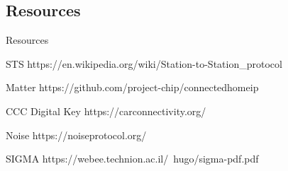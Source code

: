 \documentclass{ctexbeamer}
\begin{document}
\subsection{Resources}
\begin{frame}{Resources}

    \begin{thebibliography}{99}
         STS
            https://en.wikipedia.org/wiki/Station-to-Station\_protocol

         Matter
            https://github.com/project-chip/connectedhomeip

          CCC Digital Key
            https://carconnectivity.org/

         Noise
            https://noiseprotocol.org/

         SIGMA
            https://webee.technion.ac.il/~hugo/sigma-pdf.pdf

    \end{thebibliography}

\end{frame}
\end{document}
